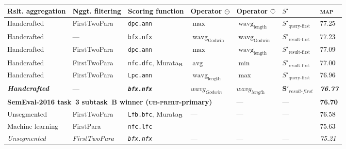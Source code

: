 \documentclass[
  digital, %
  notable, %
  lof,     %
  lot,     %
  nopalatino, color
]{fithesis3}
\newenvironment{liningfigs}{\renewcommand*{\rmdefault}{zpltlf}\normalfont}{}
\newcommand{\op}[1]{\ensuremath{\operatorname{#1}}}
\newcommand{\avg}{\op{avg}}
\newcommand{\wavg}{\op{wavg}}
\def\abbr#1{\textsc{\MakeLowercase{#1}}}
\newcommand{\omid}{\rotatebox[origin=c]{-90}{$\ominus$}}
\begin{document}
\begin{table}
\pagestyle{empty}
\centering
\begin{liningfigs}
\begin{tabular}{lllllll}
Rslt. aggregation &
  Nggt. filtering &
  Scoring function &
  Operator $\ominus$\index{.ominus@$\ominus $} &
  Operator $\omid$\index{.omid@$\kern .2ex\omid $} &
  $S'$\index{.s'@$S'$} &
  \abbr{MAP}\index{map@\abbr {MAP}} \\ \toprule
Handcrafted &
  FirstTwoPara\index{.firsttwopara@FirstTwoPara} &
  \texttt{dpc.ann} &
  $\max$ &
  $\wavg_{\textrm{length}}$\index{.wavglength@$\wavg _{\textrm  {length}}$} &
  $S'_{\textrm{query-first}}$ &
  77.25 \\
Handcrafted &
  --- &
  \texttt{bfx.nfx} &
  $\wavg_{\textrm{Godwin}}$ &
  $\wavg_{\textrm{Godwin}}$ &
  $S'_{\textrm{result-first}}$ &
  \index{.s'resultfirst@$S'_{\text  {result-first}}$}
  77.23 \\
Handcrafted &
  FirstTwoPara &
  \texttt{dpc.ann} &
  $\max$ &
  $\wavg_{\textrm{length}}$ &
  $S'_{\textrm{result-first}}$ &
  77.09 \\
Handcrafted &
  FirstTwoPara &
  \texttt{nfc.dfc}, Murata$_{\textrm B}$\index{.muratab@Murata$_{\textrm B}$} &
  $\avg$ &
  $\min$ &
  $S'_{\textrm{result-first}}$ &
  77.00 \\
Handcrafted &
  FirstTwoPara &
  \texttt{Lpc.ann} &
  $\wavg_{\textrm{length}}$ &
  $\max$ &
  $S'_{\textrm{query-first}}$ &
\index{.s'queryfirst@$S'_{\text  {query-first}}$}
  76.96 \\
\itshape\bfseries Handcrafted &
  --- &
  \bfseries\itshape\texttt{bfx.nfx} &
  \bfseries$\textit{wavg}_{\textit{Godwin}}$\index{.wavgGodwin@$\wavg_{\textrm{Godwin}}$} &
  \bfseries$\textit{wavg}_{\textit{length}}$ &
  \bfseries$\bm S'_{\textit{result-first}}$ &
  \bfseries\itshape76.77 \\
\multicolumn{4}{l}{\bfseries SemEval-2016 task~3 subtask~B winner (\abbr{UH-PRHLT}-primary)} &
  --- &
  --- &
  \bfseries76.70 \\
Unsegmented &
  FirstTwoPara &
  \texttt{Lfb.bfc}, Murata$_{\textrm B}$\index{.muratab@Murata$_{\textrm B}$} &
  --- &
  --- &
  --- &
  76.58 \\
Machine learning &
  FirstPara\index{.firstpara@FirstPara} &
  \texttt{nfc.lfc} &
  --- &
  --- &
  --- &
  75.63 \\
\itshape Unsegmented &
  \itshape FirstTwoPara &
  \itshape\texttt{bfx.nfx} &
  --- &
  --- &
  --- &
  \itshape75.21 \\

\end{tabular}
\end{liningfigs}
\end{table}
\end{document}
